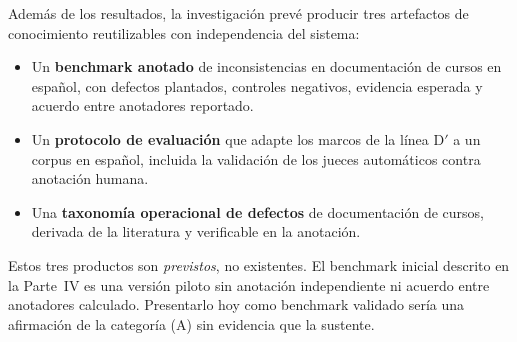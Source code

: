 Además de los resultados, la investigación prevé producir tres artefactos de
conocimiento reutilizables con independencia del sistema:

\begin{itemize}
  \item Un \textbf{benchmark anotado} de inconsistencias en documentación de cursos en
        español, con defectos plantados, controles negativos, evidencia esperada y
        acuerdo entre anotadores reportado.
  \item Un \textbf{protocolo de evaluación} que adapte los marcos de la línea D$'$ a
        un corpus en español, incluida la validación de los jueces automáticos contra
        anotación humana.
  \item Una \textbf{taxonomía operacional de defectos} de documentación de cursos,
        derivada de la literatura y verificable en la anotación.
\end{itemize}

\begin{advertencia}
Estos tres productos son \emph{previstos}, no existentes. El benchmark inicial
descrito en la Parte~IV es una versión piloto sin anotación independiente ni acuerdo
entre anotadores calculado. Presentarlo hoy como benchmark validado sería una
afirmación de la categoría (A) sin evidencia que la sustente.
\end{advertencia}
